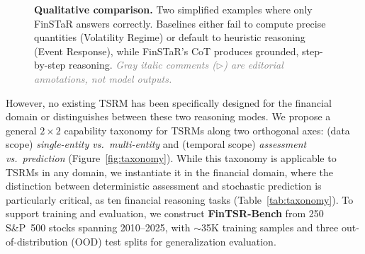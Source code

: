 \begin{figure}[t]
\caption{\textbf{Qualitative comparison.} Two simplified examples where only FinSTaR answers correctly.
Baselines either
fail to compute precise quantities (Volatility Regime)
or
default to heuristic reasoning (Event Response),
while FinSTaR's CoT produces grounded, step-by-step reasoning.
\textcolor{gray}{\textit{Gray italic comments ($\triangleright$) are editorial annotations, not model outputs.}}}
\label{fig:qualitative}
\vspace{-10pt}
\end{figure}


However, no existing TSRM has been specifically designed for the financial domain or distinguishes between these two reasoning modes.
We propose a general $2 \times 2$ capability taxonomy for TSRMs along two orthogonal axes: (data scope) \textit{single-entity vs.\ multi-entity} and (temporal scope) \textit{assessment vs.\ prediction} (Figure~\ref{fig:taxonomy}).
While this taxonomy is applicable to TSRMs in any domain, we instantiate it in the financial domain, where the distinction between deterministic assessment and stochastic prediction is particularly critical,
as ten financial reasoning tasks (Table~\ref{tab:taxonomy}).
To support training and evaluation, we construct \textbf{FinTSR-Bench} from 250 S\&P~500 stocks spanning 2010--2025, with ${\sim}$35K training samples and three out-of-distribution (OOD) test splits for generalization evaluation.

